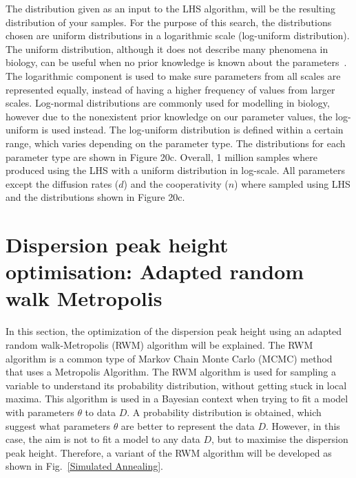 The distribution given as an input to the LHS algorithm, will be the resulting distribution of your samples. For the purpose of this search, the distributions chosen are uniform distributions in a logarithmic scale (log-uniform distribution). The uniform distribution, although it does not describe many phenomena in biology, can be useful when no prior knowledge is known about the parameters~\parencite{Frank2009}. The logarithmic component is used to make sure parameters from all scales are represented equally, instead of having a higher frequency of values from larger scales. Log-normal distributions are commonly used for modelling in biology, however due to the nonexistent prior knowledge on our parameter values, the log-uniform is used instead. The log-uniform distribution is defined within a certain range, which varies depending on the parameter type. The distributions for each parameter type are shown in Figure 20c. Overall, 1 million samples where produced using the LHS with a uniform distribution in log-scale. All parameters except the diffusion rates ($d$) and the cooperativity ($n$) where sampled using LHS and the distributions shown in Figure 20c.



\section{Dispersion peak height optimisation: Adapted random walk Metropolis}
In this section, the optimization of the dispersion peak height using an adapted random walk-Metropolis (RWM) algorithm will be explained.
The RWM algorithm is a common type of Markov Chain Monte Carlo (MCMC) method that uses a Metropolis Algorithm.
The RWM algorithm is used for sampling a variable to understand its probability distribution, without getting stuck in local maxima.
This algorithm is used in a Bayesian context when trying to fit a model with parameters $\theta$ to data $D$.
A probability distribution is obtained, which suggest what parameters $\theta$ are better to represent the data $D$.
However, in this case, the aim is not to fit a model to any data $D$, but to maximise the dispersion peak height.
Therefore, a variant of the RWM algorithm will be developed as shown in Fig.~\ref{Simulated Annealing}.

